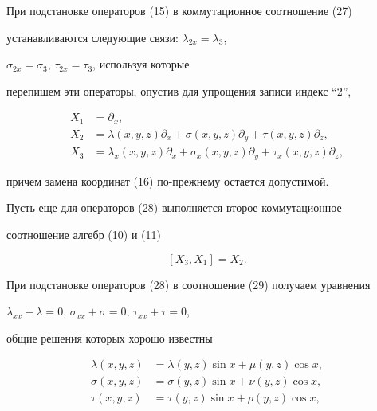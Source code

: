 При подстановке операторов (15) в коммутационное соотношение (27) 


устанавливаются следующие связи: $\lambda_{2x}=\lambda_3$, 


$\sigma_{2x}=\sigma_3$, $\tau_{2x}=\tau_3$, используя которые 


перепишем эти операторы, опустив для упрощения записи индекс ``2'', 


\begin{equation} 


\begin{split} 


X_1&=\partial_x,\\ 


X_2&=\lambda(x,y,z)\partial_x+\sigma(x,y,z)\partial_y+ 


\tau(x,y,z)\partial_z,\\ 


X_3&=\lambda_x(x,y,z)\partial_x+\sigma_x(x,y,z)\partial_y+ 


\tau_x(x,y,z)\partial_z, 


\end{split} 


\end{equation} 


причем замена координат (16) по-прежнему остается допустимой. 


 


Пусть еще для операторов (28) выполняется второе коммутационное 


соотношение алгебр (10) и (11)


\begin{equation} 


[X_3,X_1]=X_2. 


\end{equation} 


При подстановке операторов (28) в соотношение (29) получаем уравнения 


$\lambda_{xx}+\lambda=0$, $\sigma_{xx}+\sigma=0$, $\tau_{xx}+\tau=0$, 


общие решения которых хорошо известны


\begin{equation} 


\begin{split} 


\lambda(x,y,z)&=\lambda(y,z)\sin x+\mu(y,z)\cos x,\\ 


\sigma(x,y,z)&=\sigma(y,z)\sin x+\nu(y,z)\cos x,\\ 


\tau(x,y,z)&=\tau(y,z)\sin x+\rho(y,z)\cos x, 


\end{split} 


\end{equation} 


